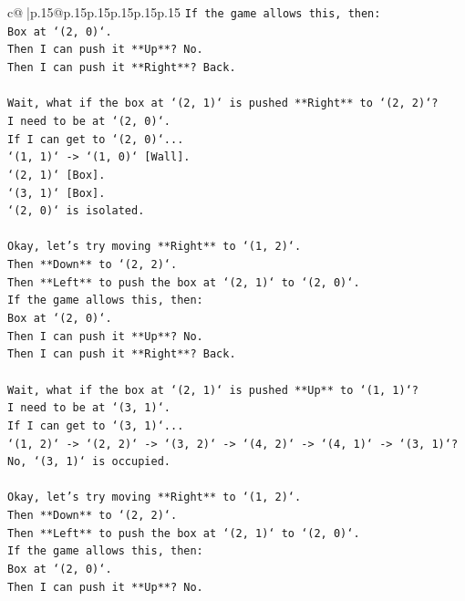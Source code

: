 \documentclass{article}
\begin{document}
{\begin{supertabular}{c@{$\;$}|p{.15\linewidth}@{}p{.15\linewidth}p{.15\linewidth}p{.15\linewidth}p{.15\linewidth}p{.15\linewidth}}
{{{\texttt{If the game allows this, then:} \\
\texttt{Box at `(2, 0)`.} \\
\texttt{Then I can push it **Up**? No.} \\
\texttt{Then I can push it **Right**? Back.} \\
\\ 
\texttt{Wait, what if the box at `(2, 1)` is pushed **Right** to `(2, 2)`?} \\
\texttt{I need to be at `(2, 0)`.} \\
\texttt{If I can get to `(2, 0)`...} \\
\texttt{`(1, 1)` {-}> `(1, 0)` {[}Wall{]}.} \\
\texttt{`(2, 1)` {[}Box{]}.} \\
\texttt{`(3, 1)` {[}Box{]}.} \\
\texttt{`(2, 0)` is isolated.} \\
\\ 
\texttt{Okay, let's try moving **Right** to `(1, 2)`.} \\
\texttt{Then **Down** to `(2, 2)`.} \\
\texttt{Then **Left** to push the box at `(2, 1)` to `(2, 0)`.} \\
\texttt{If the game allows this, then:} \\
\texttt{Box at `(2, 0)`.} \\
\texttt{Then I can push it **Up**? No.} \\
\texttt{Then I can push it **Right**? Back.} \\
\\ 
\texttt{Wait, what if the box at `(2, 1)` is pushed **Up** to `(1, 1)`?} \\
\texttt{I need to be at `(3, 1)`.} \\
\texttt{If I can get to `(3, 1)`...} \\
\texttt{`(1, 2)` {-}> `(2, 2)` {-}> `(3, 2)` {-}> `(4, 2)` {-}> `(4, 1)` {-}> `(3, 1)`? No, `(3, 1)` is occupied.} \\
\\ 
\texttt{Okay, let's try moving **Right** to `(1, 2)`.} \\
\texttt{Then **Down** to `(2, 2)`.} \\
\texttt{Then **Left** to push the box at `(2, 1)` to `(2, 0)`.} \\
\texttt{If the game allows this, then:} \\
\texttt{Box at `(2, 0)`.} \\
\texttt{Then I can push it **Up**? No.} \\
}}}
\end{supertabular}}
\end{document}
